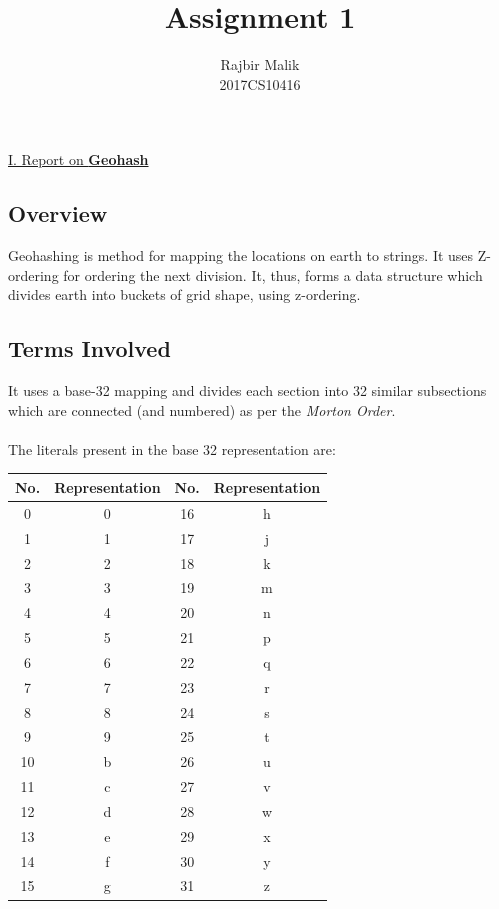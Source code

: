 \documentclass{article}
\title{Assignment 1}
\author{Rajbir Malik \\ 2017CS10416}
\begin{document}
    
    \maketitle
    
    \begin{center}
    \Large{\underline{I. Report on \textbf{Geohash}}}
    \end{center}
    
    \subsection*{Overview}
    Geohashing is method for mapping the locations on earth to strings. It uses Z-ordering for ordering the next division. It, thus, forms a data structure which divides earth into buckets of grid shape, using z-ordering.
    
    \subsection*{Terms Involved}
    It uses a base-32 mapping and divides each section into 32 similar subsections which are connected (and numbered) as per the \emph{Morton Order}.\\\\
    The literals present in the base 32 representation are:
    \begin{center}
        \begin{tabular}{|c|c||c|c|}
             \hline
             No. & Representation & No. & Representation\\
             \hline
             0 & 0 & 16 & h\\
             \hline
             1 & 1 & 17 & j\\
             \hline
             2 & 2 & 18 & k\\
             \hline
             3 & 3 & 19 & m\\
             \hline
             4 & 4 & 20 & n\\
             \hline
             5 & 5 & 21 & p\\
             \hline
             6 & 6 & 22 & q\\
             \hline
             7 & 7 & 23 & r\\
             \hline
             8 & 8 & 24 & s\\
             \hline
             9 & 9 & 25 & t\\
             \hline
             10 & b & 26 & u\\
             \hline
             11 & c & 27 & v\\
             \hline
             12 & d & 28 & w\\
             \hline
             13 & e & 29 & x\\
             \hline
             14 & f & 30 & y\\
             \hline
             15 & g & 31 & z\\
             \hline
        \end{tabular}
    \end{center}
    
\end{document}
